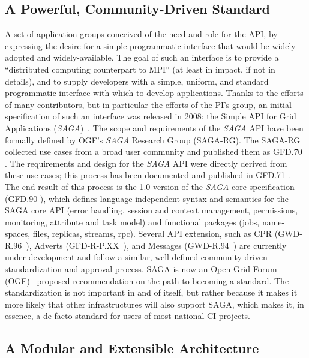 \documentclass[a4paper,10pt]{article}
\newcommand{\sagaspec}{\textit{SAGA}\xspace}
\newcommand{\spec}{\sagaspec}
\begin{document}
\subsection*{A Powerful, Community-Driven Standard}
A set of application groups conceived of the need and role for the
API, by expressing the desire for a simple programmatic interface that
would be widely-adopted and widely-available.  The goal of such an
interface is to provide a ``distributed computing counterpart to MPI''
(at least in impact, if not in details), and to supply developers with
a simple, uniform, and standard programmatic interface with which to
develop applications.  Thanks to the efforts of many contributors, but
in particular the efforts of the PI's group, an initial specification
of such an interface was released in 2008: the Simple API for Grid
Applications (\spec)~\cite{ogf-gfd-90}. The scope and requirements of
the \spec API have been formally defined by OGF's \spec Research Group
(SAGA-RG).  The SAGA-RG collected use cases from a broad user
community and published them as GFD.70 \cite{ogf-gfd-70}. The
requirements and design for the \spec API were directly derived from
these use cases; this process has been documented and published in
GFD.71 \cite{ogf-gfd-71}. The end result of this process is the 1.0
version of the \spec core specification (GFD.90 \cite{ogf-gfd-90}),
which defines language-independent syntax and semantics for the SAGA
core API (error handling, session and context management, permissions,
monitoring, attribute and task model) and functional packages (jobs,
name-spaces, files, replicas, streams, rpc). Several API extension,
such as CPR (GWD-R.96~\cite{ogf-gwd-r-96}), Adverts
(GFD-R-P.XX~\cite{ogf-gwd-r-p-xx}), and Messages
(GWD-R.94~\cite{ogf-gwd-r-94}) are currently under development and
follow a similar, well-defined community-driven standardization and
approval process. SAGA is now an Open Grid Forum (OGF)~\cite{ogf}
proposed recommendation on the path to becoming a standard.  The
standardization is not important in and of itself, but rather because
it makes it more likely that other infrastructures will also support
SAGA, which makes it, in essence, a de facto standard for users of
most national CI projects.

\subsection*{A Modular and Extensible Architecture}
\end{document}
